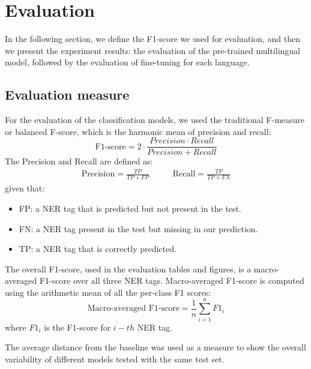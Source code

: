\documentclass[sigconf]{acmart}
\begin{document}
\section{Evaluation}
\label{sec:evaluation}
In the following section, we define the F1-score we used for evaluation, and then we present the experiment results: the evaluation of the pre-trained multilingual model, followed by the evaluation
of fine-tuning for each language.

\subsection{Evaluation measure}
For the evaluation of the classification models, we used the traditional F-measure or balanced F-score, which is the harmonic mean of precision and recall:
\begin{equation*}
    \text{F1-score} = 2  \cdot \frac{Precision \cdot Recall}{Precision +  Recall}
\end{equation*}
The Precision and Recall are defined as:
\begin{equation*}
\begin{split}
    \text{Precision} = \frac{TP}{TP + FP}
\end{split}
\quad\quad
\begin{split}
    \text{Recall} = \frac{TP}{TP + FN}
\end{split}
\end{equation*}
given that:
\begin{itemize}
  \item FP: a NER tag that is predicted but not present in the test.
  \item FN: a NER tag present in the test but missing in our prediction.
  \item TP: a NER tag that is correctly predicted.
\end{itemize}

The overall F1-score, used in the evaluation tables and figures, is a macro-averaged F1-score over all three NER tags.
Macro-averaged F1-score is computed using the arithmetic mean of all the per-class F1 scores:
\begin{equation*}
    \text{Macro-averaged F1-score} = \frac{1}{n}\sum_{i=1}^{n} F1_i
\end{equation*}
where $F1_i$ is the F1-score for $i-th$ NER tag.

The average distance from the baseline was used as a measure to show the overall variability of different models tested with the same test set.
\end{document}
